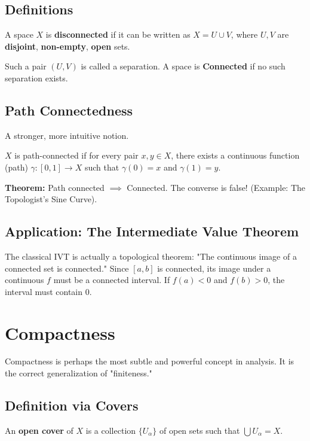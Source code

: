 \documentclass[oneside]{book}
\begin{document}
\subsection{Definitions}
\begin{definition}[Disconnected]
A space $X$ is \textbf{disconnected} if it can be written as $X = U \cup V$, where $U, V$ are \textbf{disjoint}, \textbf{non-empty}, \textbf{open} sets.
\end{definition}
Such a pair $(U, V)$ is called a separation.
A space is \textbf{Connected} if no such separation exists.

\subsection{Path Connectedness}
A stronger, more intuitive notion.
\begin{definition}
$X$ is path-connected if for every pair $x, y \in X$, there exists a continuous function (path) $\gamma: [0, 1] \to X$ such that $\gamma(0) = x$ and $\gamma(1) = y$.
\end{definition}
\textbf{Theorem:} Path connected $\implies$ Connected.
The converse is false! (Example: The Topologist's Sine Curve).

\subsection{Application: The Intermediate Value Theorem}
The classical IVT is actually a topological theorem:
"The continuous image of a connected set is connected."
Since $[a, b]$ is connected, its image under a continuous $f$ must be a connected interval. If $f(a) < 0$ and $f(b) > 0$, the interval must contain 0.

\section{Compactness}

Compactness is perhaps the most subtle and powerful concept in analysis. It is the correct generalization of "finiteness."

\subsection{Definition via Covers}
\begin{definition}
An \textbf{open cover} of $X$ is a collection $\{U_\alpha\}$ of open sets such that $\bigcup U_\alpha = X$.
\end{definition}
\end{document}

